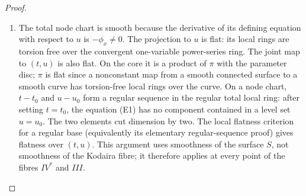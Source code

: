 \begin{proof}
\begin{enumerate}[label=\arabic*.,leftmargin=*]
\item The total node chart is smooth because the derivative of its defining
equation with respect to $u$ is $-\phi_x\ne0$. The projection to $u$
is flat: its local rings are torsion free over the convergent
one-variable power-series ring. The joint map to $(t,u)$ is also
flat. On the core it is a product of $\pi$ with the parameter disc;
$\pi$ is flat since a nonconstant map from a smooth connected surface
to a smooth curve has torsion-free local rings over the curve. On a
node chart, $t-t_0$ and $u-u_0$ form a regular sequence in the regular
total local ring: after setting $t=t_0$, the equation (E1) has no
component contained in a level set $u=u_0$. The two elements cut
dimension by two. The local flatness criterion for a regular base
(equivalently its elementary regular-sequence proof) gives flatness
over $(t,u)$. This argument uses smoothness of the surface $S$, not
smoothness of the Kodaira fibre; it therefore applies at every point
of the fibres $IV^*$ and $III$.
\end{enumerate}
\end{proof}

